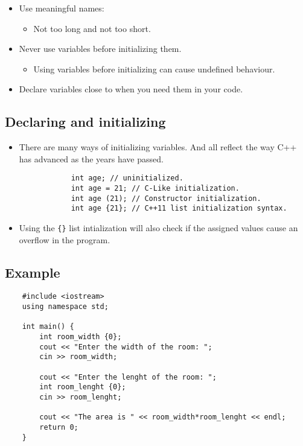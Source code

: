 \begin{itemize}
    \item Use meaningful names:
        \begin{itemize}
            \item Not too long and not too short.
        \end{itemize}
    \item Never use variables before initializing them.
        \begin{itemize}
            \item Using variables before initializing can cause undefined behaviour.
        \end{itemize}
    \item Declare variables close to when you need them in your code.
\end{itemize}


\subsection{Declaring and initializing}
\begin{itemize}    
    \item There are many ways of initializing variables. And all reflect the way C++ has advanced as the years have passed.
        \begin{verbatim}
            int age; // uninitialized.
            int age = 21; // C-Like initialization.
            int age (21); // Constructor initialization.
            int age {21}; // C++11 list initialization syntax.
        \end{verbatim}
    
    \item Using the \verb|{}| list intialization will also check if the assigned values cause an overflow in the program.
\end{itemize}

\subsection{Example}
\begin{verbatim}
    #include <iostream>
    using namespace std;

    int main() {
        int room_width {0};
        cout << "Enter the width of the room: ";
        cin >> room_width;

        cout << "Enter the lenght of the room: ";
        int room_lenght {0};
        cin >> room_lenght;

        cout << "The area is " << room_width*room_lenght << endl;
        return 0;
    }
\end{verbatim}


